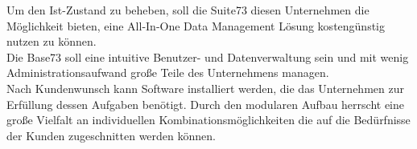 Um den Ist-Zustand zu beheben, soll die Suite73 diesen Unternehmen die Möglichkeit bieten, eine All-In-One Data Management Lösung kostengünstig nutzen zu können.\\
Die Base73 soll eine intuitive Benutzer- und Datenverwaltung sein und mit wenig Administrationsaufwand große Teile des Unternehmens managen.\\
Nach Kundenwunsch kann Software installiert werden, die das Unternehmen zur Erfüllung dessen Aufgaben benötigt. Durch den modularen Aufbau herrscht eine große Vielfalt an individuellen Kombinationsmöglichkeiten die auf die Bedürfnisse der Kunden zugeschnitten werden können.
